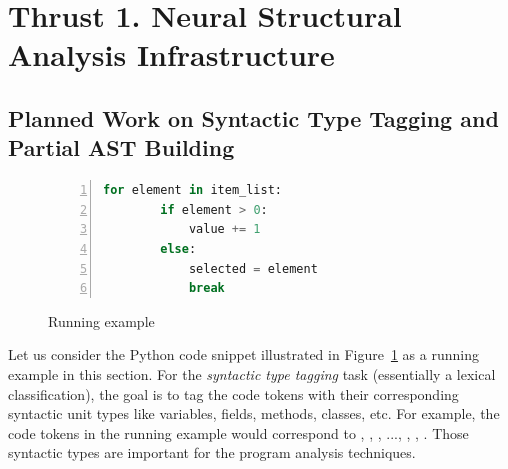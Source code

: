 \section{Thrust 1. Neural Structural Analysis Infrastructure}
\label{sec:thrust1}

\subsection*{Planned Work on Syntactic Type Tagging and Partial AST Building}

\begin{figure}
\begin{lstlisting}[basicstyle=\scriptsize\sffamily, stepnumber=1, numbers=left, numbersep=-6pt, framexleftmargin=0mm, framexrightmargin=0mm, language=Python, emph ={}]
    for element in item_list:
        if element > 0:
            value += 1
        else:
            selected = element
            break
\end{lstlisting}
\vspace{-14pt}
\caption{Running example}
\label{run_ex}
\end{figure}

Let us consider the Python code snippet illustrated in Figure~\ref{run_ex} as a running example in this section. For the {\em syntactic type tagging} task (essentially a lexical classification), the goal is to tag the code tokens with their corresponding syntactic unit types like variables, fields, methods, classes, etc. For example, the code tokens in the running example would correspond to , , , ..., \code{=}, , . Those syntactic types are important for the program analysis techniques.


